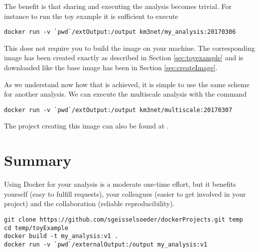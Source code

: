 \documentclass[a4paper, twoside, 11pt]{article}
\begin{document}
The benefit is that sharing and executing the analysis becomes trivial. 
For instance to run the toy example it is sufficient to execute 
\begin{lstlisting}[basicstyle=\ttfamily\small,columns=flexible,keepspaces=true,frame=single]
docker run -v `pwd`/extOutput:/output km3net/my_analysis:20170306
\end{lstlisting}
This does not require you to build the image on your machine. 
The corresponding image has been created exactly as described in Section \ref{sec:toyexample} 
and is downloaded like the base image has been in Section \ref{sec:createImage}. 

As we understand now how that is achieved, 
it is simple to use the same scheme for another analysis. 
We can execute the multiscale analysis 
\cite{geisselsoeder:phd, gith:multiscale} with the command 
\begin{lstlisting}[basicstyle=\ttfamily\small,columns=flexible,keepspaces=true,frame=single]
docker run -v `pwd`/extOutput:/output km3net/multiscale:20170307
\end{lstlisting}
The project creating this image can also be found at \cite{gith:tutorial}.

\section{Summary}

Using Docker for your analysis is a moderate one-time effort, 
but it benefits yourself (easy to fulfill requests), 
your colleagues (easier to get involved in your project) 
and the collaboration (reliable reproducibility).
\bigskip

\begin{lstlisting}[basicstyle=\ttfamily\small,columns=flexible,keepspaces=true,frame=single]
git clone https://github.com/sgeisselsoeder/dockerProjects.git temp
cd temp/toyExample
docker build -t my_analysis:v1 .
docker run -v `pwd`/externalOutput:/output my_analysis:v1
\end{lstlisting}




\end{document}
